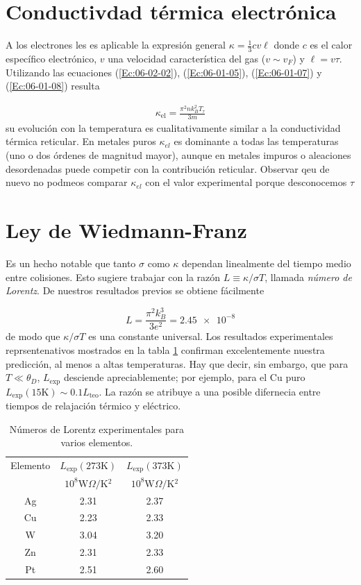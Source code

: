 \section{Conductivdad térmica electrónica}

A los electrones les es aplicable la expresión general $\kappa=\frac{1}{3}cv\ell$ donde $c$ es el calor específico electrónico, $v$ una velocidad característica del gas ($v\sim v_F$) y $\ell = v \tau$. Utilizando las ecuaciones (\ref{Ec:06-02-02}), (\ref{Ec:06-01-05}), (\ref{Ec:06-01-07}) y (\ref{Ec:06-01-08}) resulta

\begin{eqnarray}
	\kappa_{\text{el}} = \frac{\pi^2 n k_B^2 T_\tau}{3m}
\end{eqnarray}
su evolución con la temperatura es cualitativamente similar a la conductividad térmica reticular. En metales puros $\kappa_{el}$ es dominante a todas las temperaturas (uno o dos órdenes de magnitud mayor), aunque en metales impuros o aleaciones desordenadas puede competir con la contribución reticular. Observar qeu de nuevo no podmeos comparar $\kappa_{el}$ con el valor experimental porque desconocemos $\tau$

\section{Ley de Wiedmann-Franz}

Es un hecho notable que tanto $\sigma$ como $\kappa$ dependan linealmente del tiempo medio entre colisiones. Esto sugiere trabajar con la razón $L\equiv \kappa / \sigma T$, llamada \textit{número de Lorentz}. De nuestros resultados previos se obtiene fácilmente 

\begin{equation}
L=\frac{\pi^2 k_B^3}{3e^2} = \num{2.45e-8}
\end{equation}
de modo que $\kappa /\sigma T$ es una constante universal. Los resultados experimentales reprsentenativos mostrados en la tabla \ref{Tab:06-02} confirman excelentemente nuestra predicción, al menos a altas temperaturas. Hay que decir, sin embargo, que para $T\ll \theta_D$, $L_{\text{exp}}$ desciende apreciablemente; por ejemplo, para el Cu puro $L_{\text{exp}}(\unit{15 \kelvin}) \sim 0.1 L_{\text{teo}}$. La razón se atribuye a una posible difernecia entre tiempos de relajación térmico y eléctrico.

\begin{table}[h!] \centering
\begin{tabular}{ccc}
	Elemento & $L_{\text{exp}} (\unit{273 \kelvin})$ & $L_{\text{exp}} (\unit{373 \kelvin})$  \\
	& $10^8\unit{\watt \Omega / \kelvin^2}$ &  $10^8\unit{\watt \Omega / \kelvin^2}$ \\ \hline
	Ag & 2.31 & 2.37 \\
	Cu & 2.23 & 2.33 \\
	W  & 3.04 & 3.20 \\
	Zn & 2.31 & 2.33 \\
	Pt & 2.51 & 2.60
\end{tabular}	
\caption{Números de Lorentz experimentales para varios elementos.}
\label{Tab:06-02}
\end{table}

